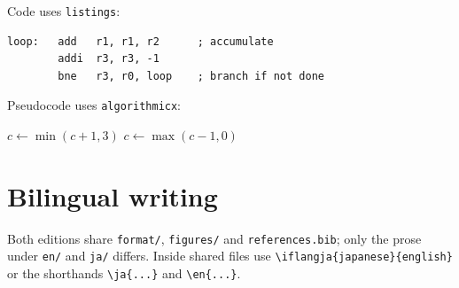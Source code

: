 \documentclass[../main.tex]{subfiles}
\begin{document}
Code uses \verb|listings|:
\begin{lstlisting}[language={[x86masm]Assembler}, caption={A loop in assembly.}]
loop:   add   r1, r1, r2      ; accumulate
        addi  r3, r3, -1
        bne   r3, r0, loop    ; branch if not done
\end{lstlisting}

Pseudocode uses \verb|algorithmicx|:
\begin{algorithm}[htbp]
  \caption{Two-bit saturating counter update}
  \begin{algorithmic}[1]
      \State $c \gets \min(c+1, 3)$
    \Else
      \State $c \gets \max(c-1, 0)$
    \EndIf
  \end{algorithmic}
\end{algorithm}

\section{Bilingual writing}

Both editions share \texttt{format/}, \texttt{figures/} and
\texttt{references.bib}; only the prose under \texttt{en/} and \texttt{ja/}
differs.  Inside shared files use \verb|\iflangja{japanese}{english}| or the
shorthands \verb|\ja{...}| and \verb|\en{...}|.
\end{document}
